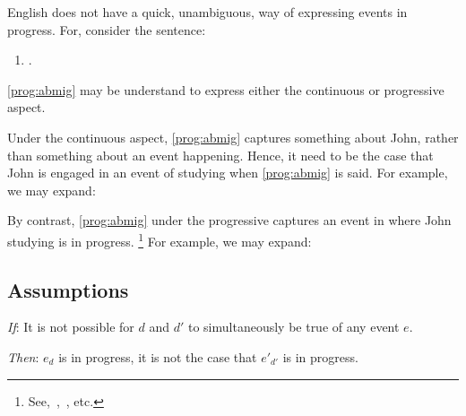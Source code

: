 \begin{note}
  \noindent%
  English does not have a quick, unambiguous, way of expressing events in progress.
  For, consider the sentence:
  \begin{enumerate}[label=\arabic*., ref=(\arabic*)]
  \item
    \label{prog:abmig}
    .
  \end{enumerate}
  \ref{prog:abmig} may be understand to express either the continuous or progressive aspect.

  Under the continuous aspect, \ref{prog:abmig} captures something about John, rather than something about an event happening.
  Hence, it need to be the case that John is engaged in an event of studying when \ref{prog:abmig} is said.
  For example, we may expand:

  By contrast, \ref{prog:abmig} under the progressive captures an event in where John studying is in progress.%
  \footnote{
    See,~\textcite{Richards:1981wo},~\textcite{Portner:2011vi}, etc.
  }
  For example, we may expand:
\end{note}


\subsection{Assumptions}
\label{sec:assumptions-1}


\begin{note}
  \begin{assumption}[Exclusivity]
    \label{assu:p:ex}
    \vspace{-\baselineskip}
    \begin{itenum}
    \item[\emph{If}:]
      It is not possible for \(d\) and \(d'\) to simultaneously be true of any event \(e\).
    \item[\emph{Then}:]
      \(e_{d}\) is in progress, it is not the case that \(e'_{d'}\) is in progress.
    \end{itenum}
    \vspace{-\baselineskip}
  \end{assumption}
\end{note}




